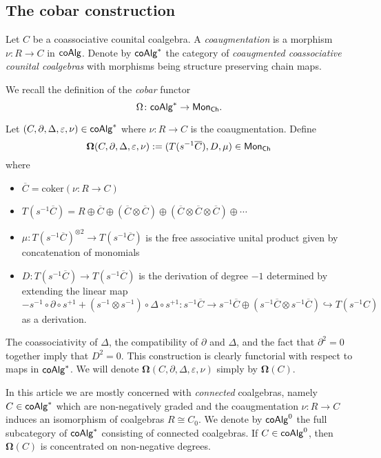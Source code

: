 

\subsection{The cobar construction}

Let $C$ be a coassociative counital coalgebra.
A \textit{coaugmentation} is a morphism $\nu \colon R \to C$ in $\mathsf{coAlg}$.
Denote by $\mathsf{coAlg}^*$ the category of \textit{coaugmented coassociative counital coalgebras} with morphisms being structure preserving chain maps.

We recall the definition of the \textit{cobar} functor 
\begin{equation*}
\Omega \colon \mathsf{coAlg}^* \to \mathsf{Mon}_{\mathsf{Ch}}.
\end{equation*}

Let  $(C, \partial, \Delta, \varepsilon, \nu)  \in \mathsf{coAlg}^*$ where $\nu: R \to C$ is the coaugmentation. Define
$$\mathbf{\Omega}(C, \partial, \Delta, \varepsilon, \nu) := ( T(s^{-1}  \overline{C} ), D, \mu) \in \mathsf{Mon}_{\mathsf{Ch}}$$ where 
\begin{itemize}
\item $\overline{C}=\text{coker}(\nu: R \to C)$
\item $T(s^{-1} \overline{C})= R \oplus \overline{C} \oplus (\overline{C}  \otimes \overline{C} ) \oplus ( \overline{C} \otimes \overline{C} \otimes \overline{C} ) \oplus\cdots $
\item $\mu: T(s^{-1}  \overline{C} )^{\otimes 2} \to T(s^{-1}  \overline{C} ) $ is the free associative unital product given by concatenation of monomials
\item $D: T(s^{-1}  \overline{C} ) \to T(s^{-1}  \overline{C} )$ is the derivation of degree $-1$ determined by extending the linear map $$- s^{-1} \circ \partial \circ s^{+1} + (s^{-1} \otimes s^{-1}) \circ \Delta \circ s^{+1}: s^{-1}\overline{C} \to s^{-1}\overline{C} \oplus (s^{-1}\overline{C} \otimes s^{-1}\overline{C}) \hookrightarrow T(s^{-1}C)$$ as a derivation.
\end{itemize}

The coassociativity of $\Delta$, the compatibility of $\partial$ and $\Delta$, and the fact that $\partial^2 =0$ together imply that $D^2=0$. This construction is clearly functorial with respect to maps in $\mathsf{coAlg}^*$. We will denote $\mathbf{\Omega} (C, \partial, \Delta, \varepsilon, \nu)$ simply by $\mathbf{\Omega}(C)$. 

In this article we are mostly concerned with \textit{connected} coalgebras, namely $C \in \mathsf{coAlg}^*$ which are non-negatively graded and the coaugmentation $\nu: R \to C$ induces an isomorphism of coalgebras $R \cong C_0$. We denote by $\mathsf{coAlg}^0$ the full subcategory of $\mathsf{coAlg}^*$ consisting of connected coalgebras. If $C \in \mathsf{coAlg}^0$, then $\mathbf{\Omega}(C)$ is concentrated on non-negative degrees. 

